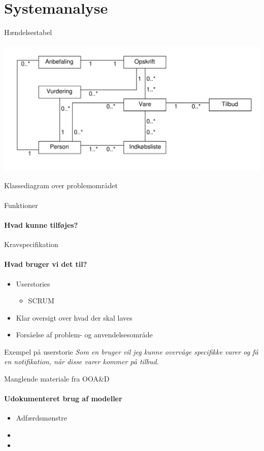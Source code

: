 \section{Systemanalyse}
\begin{frame}{Hændelsestabel}
	\framesubtitle{}
	\includegraphics[width=1\textwidth]{images/klassediagram_model_simple.pdf}
\end{frame}
\begin{frame}{Klassediagram over problemområdet}
	\framesubtitle{}
	
\end{frame}
\begin{frame}{Funktioner}
	\framesubtitle{Hvad kunne tilføjes?}
	
\end{frame}

\begin{frame}{Kravspecifikation}
	\framesubtitle{Hvad bruger vi det til?}
	\begin{itemize} 
    	\item Userstories
    	\begin{itemize}
    		\item SCRUM
    	\end{itemize}
    	\item Klar oversigt over hvad der skal laves
    	\item Forsåelse af problem- og anvendelsesområde
  	\end{itemize}
    \begin{beamerboxesrounded}[upper=headerCol,lower=bodyCol,shadow=true]{Exempel på userstorie}
    \textit{Som en bruger vil jeg kunne overvåge specifikke varer og få en notifikation, når disse
varer kommer på tilbud.}
    \end{beamerboxesrounded}

\end{frame}
\begin{frame}{Manglende materiale fra OOA\&D}
	\framesubtitle{Udokumenteret brug af modeller}
	\begin{itemize} 
    \item Adfærdsmønstre
    \item 
    \item 
  \end{itemize}
\end{frame}
